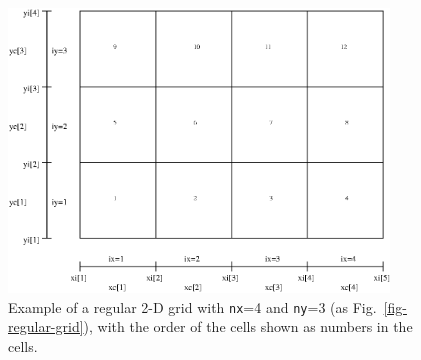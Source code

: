 \documentclass{report}
\begin{document}
%
\begin{figure}
\centerline{\includegraphics[width=0.9\textwidth]{base_amr.eps}}
\caption{\label{fig-regular-grid-numbered}
Example of a regular 2-D grid with {\small\tt nx}=4 and {\small\tt ny}=3
(as Fig.~\ref{fig-regular-grid}), with the order of the cells shown as
numbers in the cells.
}
\end{figure}
%
\end{document}
